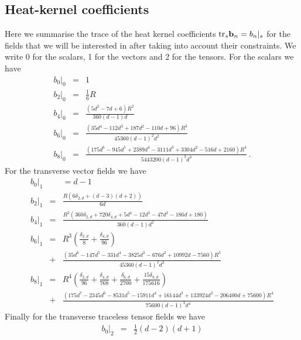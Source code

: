 \documentclass[notitlepage,eqsecnum,bm,amsmath,preprintnumbers,superscriptaddress,nofootinbib,aps,11pt]{revtex4-1}
\begin{document}
\subsection*{Heat-kernel coefficients}
Here we summarise the trace of the heat kernel coefficients $\textnormal{tr}_s\mathbf{b}_n=b_n|_{s}$ for the fields that we will be interested in after taking into account their constraints. We write 0 for the scalars, 1 for the vectors and 2 for the tensors. For the scalars we have
\begin{eqnarray}
b_0|_{0} &=& 1\\
b_2|_{0} &=& \frac{1}{6} R \\
b_4|_{0} &=& \frac{\left(5 d^2-7 d+6\right) R^2}{360 (d-1) d} \\
b_6|_{0} &=& \frac{\left(35 d^4-112 d^3+187 d^2-110 d+96\right) R^3}{45360 (d-1)^2d^2} \\
b_8|_0&=& \frac{\left(175 d^6-945 d^5+2389 d^4-3111 d^3+3304 d^2-516 d+2160\right)
  R^4}{5443200 (d-1)^3 d^3} \,.
\end{eqnarray}
For the transverse vector fields we have
\begin{eqnarray}
b_0|_1& &= d-1\\
b_2|_1 &=& \frac{R (6 \delta _{2,d}+(d-3) (d+2))}{6 d}\\
b_4|_1 &=&\frac{R^2 \left(360 \delta _{2,d}+720 \delta _{4,d}+5 d^4-12 d^3-47 d^2-186 d+180\right)}{360 (d-1) d^2}
 \\
b_6|_1&=& R^3 \left(\frac{\delta _{2,d}}{8}+\frac{\delta
  _{4,d}}{96}\right) \\
   &+&\frac{\left(35 d^6-147 d^5-331 d^4-3825 d^3-676
  d^2+10992 d-7560\right) R^3}{45360 (d-1)^2 d^3} \nonumber \\
b_8|_1 &=&R^4 \left(\frac{\delta _{2,d}}{96}+\frac{\delta _{4,d}}{768}+\frac{\delta
  _{6,d}}{2700}+\frac{15 \delta _{8,d}}{175616}\right) \\
  &+& \frac{\left(175
  d^7-2345 d^6-8531 d^5-15911 d^4+16144 d^3+133924 d^2-206400
  d+75600\right) R^4}{75600 (d-1)^3 d^4} \nonumber
\end{eqnarray}
Finally for the transverse traceless tensor fields we have
\begin{eqnarray}
b_0|_{2} & =& \frac{1}{2} (d-2) (d+1) 
\end{eqnarray}
\end{document}

